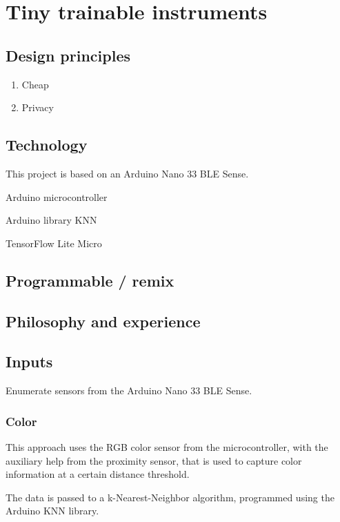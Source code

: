 \chapter{Tiny trainable instruments}

\section{Design principles}

\begin{enumerate}
  \item Cheap
  \item Privacy
\end{enumerate}

\section{Technology}

This project is based on an Arduino Nano 33 BLE Sense.

Arduino microcontroller

Arduino library KNN

TensorFlow Lite Micro

\section{Programmable / remix}

\section{Philosophy and experience}

\section{Inputs}

Enumerate sensors from the Arduino Nano 33 BLE Sense.

\subsection{Color}

This approach uses the RGB color sensor from the microcontroller, with the auxiliary help from the proximity sensor, that is used to capture color information at a certain distance threshold.

The data is passed to a k-Nearest-Neighbor algorithm, programmed using the Arduino KNN library.

